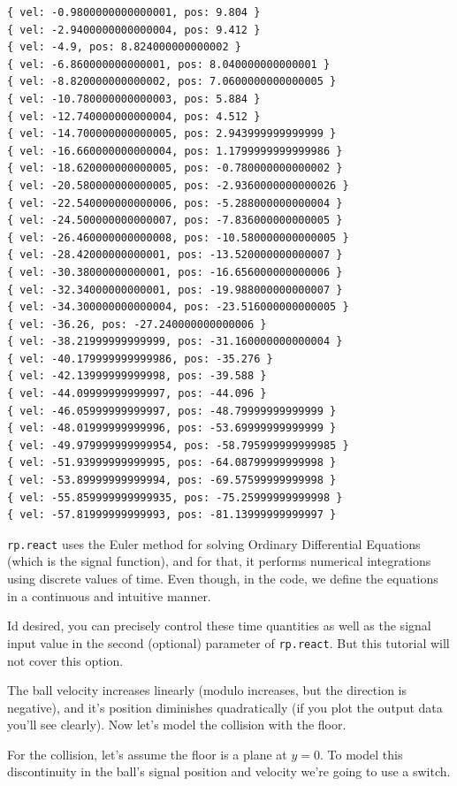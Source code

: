 \documentclass[notitlepage]{article}
\begin{document}
\begin{verbatim}
{ vel: -0.9800000000000001, pos: 9.804 }
{ vel: -2.9400000000000004, pos: 9.412 }
{ vel: -4.9, pos: 8.824000000000002 }
{ vel: -6.860000000000001, pos: 8.040000000000001 }
{ vel: -8.820000000000002, pos: 7.0600000000000005 }
{ vel: -10.780000000000003, pos: 5.884 }
{ vel: -12.740000000000004, pos: 4.512 }
{ vel: -14.700000000000005, pos: 2.943999999999999 }
{ vel: -16.660000000000004, pos: 1.1799999999999986 }
{ vel: -18.620000000000005, pos: -0.780000000000002 }
{ vel: -20.580000000000005, pos: -2.9360000000000026 }
{ vel: -22.540000000000006, pos: -5.288000000000004 }
{ vel: -24.500000000000007, pos: -7.836000000000005 }
{ vel: -26.460000000000008, pos: -10.580000000000005 }
{ vel: -28.42000000000001, pos: -13.520000000000007 }
{ vel: -30.38000000000001, pos: -16.656000000000006 }
{ vel: -32.34000000000001, pos: -19.988000000000007 }
{ vel: -34.300000000000004, pos: -23.516000000000005 }
{ vel: -36.26, pos: -27.240000000000006 }
{ vel: -38.21999999999999, pos: -31.160000000000004 }
{ vel: -40.179999999999986, pos: -35.276 }
{ vel: -42.13999999999998, pos: -39.588 }
{ vel: -44.09999999999997, pos: -44.096 }
{ vel: -46.05999999999997, pos: -48.79999999999999 }
{ vel: -48.01999999999996, pos: -53.69999999999999 }
{ vel: -49.979999999999954, pos: -58.795999999999985 }
{ vel: -51.93999999999995, pos: -64.08799999999998 }
{ vel: -53.89999999999994, pos: -69.57599999999998 }
{ vel: -55.859999999999935, pos: -75.25999999999998 }
{ vel: -57.81999999999993, pos: -81.13999999999997 }
\end{verbatim}

\texttt{rp.react} uses the Euler method for solving Ordinary Differential
Equations (which is the signal function), and for that, it performs numerical
integrations using discrete values of time. Even though, in the code, we define
the equations in a continuous and intuitive manner.

Id desired, you can precisely control these time quantities as well as the
signal input value in the second (optional) parameter of \texttt{rp.react}. But
this tutorial will not cover this option.

The ball velocity increases linearly (modulo increases, but the direction is
negative), and it's position diminishes quadratically (if you plot the output
data you'll see clearly). Now let's model the collision with the floor.

For the collision, let's assume the floor is a plane at $y=0$. To model this
discontinuity in the ball's signal position and velocity we're going to use a
switch.
\end{document}
